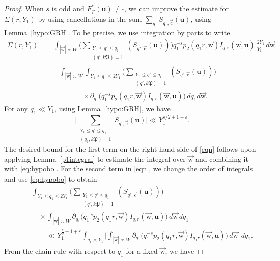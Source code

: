 \documentclass[letterpaper,11pt]{amsart}
\numberwithin{equation}{section}
\theoremstyle{definition}
\numberwithin{equation}{section}
\newcommand{\uu}{\mathbf{u}}
\newcommand{\uw}{{\vec{\mathrm{w}}}}
\newcommand{\uc}{{\vec{\mathrm{c}}}}
\newcommand{\ve}{\varepsilon}
\begin{document}
\begin{proof}
When $s$ is odd and $F_\uc^*(\uu)\not=\square$, we can improve the estimate for $\Sigma(r, Y_1)$ by using cancellations in the sum  $\sum_{q_1}S_{q_1, \uc}(\uu)$, using Lemma~\ref{hypo:GRH}. To be precise, we use integration by parts to write 
\begin{equation}
\begin{split}
 \Sigma(r, Y_1)={}&\int_{|\uw|\asymp W} 			\Big(\sum_{\substack{Y_1\leq q'\leq q_1\\ (q', k\mathfrak P)=1}}\left(S_{q',\uc}(\uu)\right)\Big)	q_1^{-s} p_{2}(q_1r,\uw) I_{q_1r}(\uw,\uu)\Big\vert_{Y_1}^{2Y_1}
\,d\uw \\ &
-\int_{|\uw|\asymp W} 			\int_{Y_1\leq q_1\leq 2Y_1}\Big(\sum_{\substack{Y_1\leq q'\leq q_1\\ (q',k\mathfrak P)=1}}\left(S_{q',\uc}(\uu)\right)\Big)	\\ &\hspace{4em}
\times \partial_{q_1}\big(q_1^{-s} p_{2}(q_1r,\uw) I_{q_1r}(\uw,\uu)\big)
\,dq_1 d\uw.\label{eqn}
\end{split}
\end{equation}
For any $q_1\ll Y_1$, using Lemma~\ref{hypo:GRH}, we have
\begin{equation}\label{eq:hypobo}
\Big|\sum_{\substack{Y_1\leq q'\leq q_1\\ (q_1, k \mathfrak P)=1}}S_{q',\uc}(\uu)\Big|\ll Y_1^{s/2+1+\ve}.
\end{equation}
The desired bound for the first term on the right hand side of \eqref{eqn} follows upon applying Lemma~\ref{p1integral} to estimate the integral over $\uw$ and combining it with \eqref{eq:hypobo}.
For the second term in \eqref{eqn}, we change the order of integrals and use \eqref{eq:hypobo} to obtain
\begin{equation}
\begin{split}
		\qquad&\int_{Y_1\leq q_1\leq 2Y_1}\Big(\sum_{\substack{Y_1\leq q'\leq q_1\\ (q',k\mathfrak P)=1}}\left(S_{q',\uc}(\uu)\right)\Big)	\\
        &\quad\times\int_{|\uw|\asymp W} 	\partial_{q_1}\big(q_1^{-s} p_{2}(q_1r,\uw)
        I_{q_1r}(\uw,\uu)\big)
\,d\uw\, dq_1\\
&\qquad \ll  Y_1^{\frac{s}{2}+1+\ve}\int_{q_1\asymp Y_1}\Big|    \int_{|\uw|\asymp W} 	\partial_{q_1}\big(q_1^{-s} p_{2}(q_1r,\uw) I_{q_1r}(\uw,\uu)\big)
\,d\uw\Big|\, dq_1.\label{q1w}
\end{split}
\end{equation}
From the chain rule with respect to $q_1$ for a fixed $\uw$, we have

\end{proof}
\end{document}
